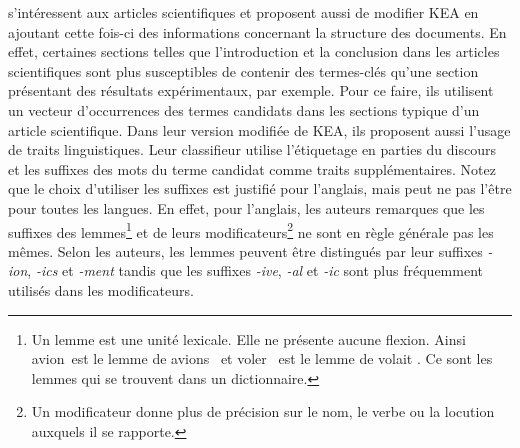         \citet{nguyen2007keadocumentstructure} s'intéressent aux articles
        scientifiques et proposent aussi de modifier KEA en ajoutant cette fois-ci
        des informations concernant la structure des documents. En effet,
        certaines sections telles que l'introduction et la conclusion dans les
        articles scientifiques sont plus susceptibles de contenir des termes-clés
        qu'une section présentant des résultats expérimentaux, par exemple. Pour
        ce faire, ils utilisent un vecteur d'occurrences des termes candidats dans les
        sections typique d'un article scientifique. Dans leur version modifiée de
        KEA, ils proposent aussi l'usage de traits linguistiques. Leur classifieur
        utilise l'étiquetage en parties du discours et les suffixes des mots du
        terme candidat comme traits supplémentaires. Notez que le choix d'utiliser les
        suffixes est justifié pour l'anglais, mais peut ne pas l'être pour toutes
        les langues. En effet, pour l'anglais, les auteurs remarques que les
        suffixes des lemmes\footnote{Un lemme est une unité lexicale. Elle ne
        présente aucune flexion. Ainsi \og avion\fg\ est le lemme de \og avions
        \fg\ et \og voler \fg\ est le lemme de \og volait \fg. Ce sont les lemmes
        qui se trouvent dans un dictionnaire.} et de leurs
        modificateurs\footnote{Un modificateur donne plus de précision sur le
        nom, le verbe ou la locution auxquels il se rapporte.} ne sont en règle
        générale pas les mêmes. Selon les auteurs, les lemmes peuvent être
        distingués par leur suffixes \textit{-ion}, \textit{-ics} et
        \textit{-ment} tandis que les suffixes \textit{-ive}, \textit{-al} et
        \textit{-ic} sont plus fréquemment utilisés dans les modificateurs.

